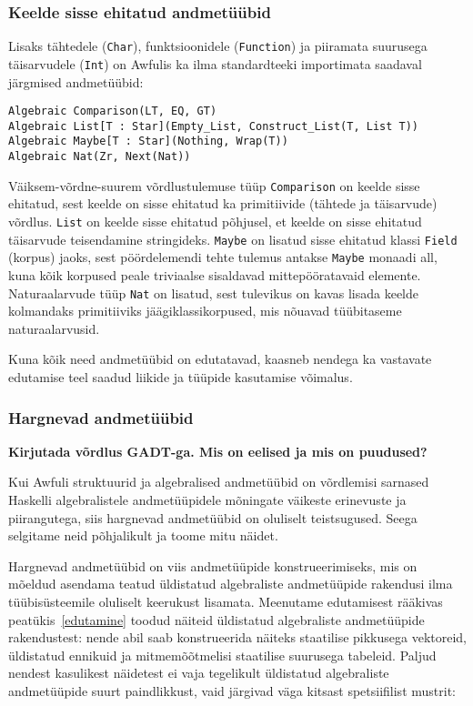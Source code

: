 \documentclass[12pt]{article}
\newcommand\markus[1]{\textcolor{roheline}{\textbf{#1}}}
\begin{document}
      \subsubsection{Keelde sisse ehitatud andmetüübid}\label{sisseehitatudalgebralised}
        Lisaks tähtedele (\verb!Char!), funktsioonidele (\verb!Function!) ja piiramata suurusega täisarvudele (\verb!Int!) on Awfulis ka ilma standardteeki importimata saadaval järgmised andmetüübid:

        \begin{verbatim}Algebraic Comparison(LT, EQ, GT)
Algebraic List[T : Star](Empty_List, Construct_List(T, List T))
Algebraic Maybe[T : Star](Nothing, Wrap(T))
Algebraic Nat(Zr, Next(Nat))\end{verbatim}

        Väiksem-võrdne-suurem võrdlustulemuse tüüp \verb!Comparison! on keelde sisse ehitatud, sest keelde on sisse ehitatud ka primitiivide (tähtede ja täisarvude) võrdlus. \verb!List! on keelde sisse ehitatud põhjusel, et keelde on sisse ehitatud täisarvude teisendamine stringideks. \verb!Maybe! on lisatud sisse ehitatud klassi \verb!Field! (korpus) jaoks, sest pöördelemendi tehte tulemus antakse \verb!Maybe! monaadi all, kuna kõik korpused peale triviaalse sisaldavad mittepööratavaid elemente. Naturaalarvude tüüp \verb!Nat! on lisatud, sest tulevikus on kavas lisada keelde kolmandaks primitiiviks jäägiklassikorpused, mis nõuavad tüübitaseme naturaalarvusid.

        Kuna kõik need andmetüübid on edutatavad, kaasneb nendega ka vastavate edutamise teel saadud liikide ja tüüpide kasutamise võimalus.
      \subsubsection{Hargnevad andmetüübid}\label{hargnevad}
        \markus{Kirjutada võrdlus GADT-ga. Mis on eelised ja mis on puudused?}

        Kui Awfuli struktuurid ja algebralised andmetüübid on võrdlemisi sarnased Haskelli algebralistele andmetüüpidele mõningate väikeste erinevuste ja piirangutega, siis hargnevad andmetüübid on oluliselt teistsugused. Seega selgitame neid põhjalikult ja toome mitu näidet.

        Hargnevad andmetüübid on viis andmetüüpide konstrueerimiseks, mis on mõeldud asendama teatud üldistatud algebraliste andmetüüpide rakendusi ilma tüübisüsteemile oluliselt keerukust lisamata. Meenutame edutamisest rääkivas peatükis~\ref{edutamine} toodud näiteid üldistatud algebraliste andmetüüpide rakendustest: nende abil saab konstrueerida näiteks staatilise pikkusega vektoreid, üldistatud ennikuid ja mitmemõõtmelisi staatilise suurusega tabeleid. Paljud nendest kasulikest näidetest ei vaja tegelikult üldistatud algebraliste andmetüüpide suurt paindlikkust, vaid järgivad väga kitsast spetsiifilist mustrit:
\end{document}
